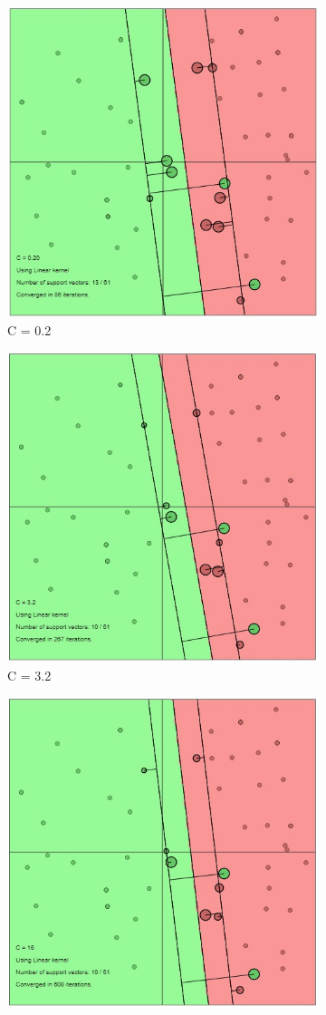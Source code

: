 {\begin{figure}[!ht] 
	\centering
	\begin{subfigure}{.32\textwidth}
		\centering
		\includegraphics[width=.65\linewidth]{Exercise1/Report/lin_C(0.2).jpg}
		\caption{C = 0.2}
		\label{fig:C0.2}
	\end{subfigure}%
	\begin{subfigure}{.32\textwidth}
		\centering
		\includegraphics[width=.65\linewidth]{Exercise1/Report/lin_C(3.2).jpg}
		\caption{C = 3.2}
		\label{fig:C3.2}
	\end{subfigure}
	\begin{subfigure}{.32\textwidth}
		\centering
		\includegraphics[width=.65\linewidth]{Exercise1/Report/lin_C(16).jpg}

\end{subfigure}
\end{figure}}
